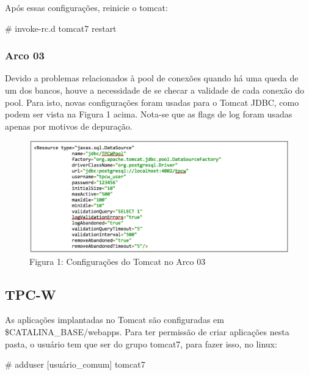 \documentclass[a4paper,10pt]{article}
\begin{document}
        Após essas configurações, reinicie o tomcat:

        \begin{spverbatim}
        # invoke-rc.d tomcat7 restart
        \end{spverbatim}

        \subsubsection{Arco 03} 
        
        Devido a problemas relacionados à pool de conexões quando há uma queda de um dos bancos, houve a necessidade de se checar a validade de cada conexão do pool. Para isto, novas configurações foram usadas para o Tomcat JDBC, como podem ser vista na Figura 1 acima. Nota-se que as flags de log foram usadas apenas por motivos de depuração.
       
        \begin{center}
        \begin{figure}
            \centering
          \includegraphics[width=14cm,keepaspectratio=true]{imagens/config_tomcat.png}
	        	        Figura 1: Configurações do Tomcat no Arco 03
        \end{figure}
	\end{center}
        
        \subsection{TPC-W}

        As aplicações implantadas no Tomcat são configuradas em \$CATALINA\_BASE/webapps. Para ter permissão de criar aplicações nesta pasta, o usuário tem que ser do grupo tomcat7, para fazer isso, no linux:

        \begin{spverbatim}
        # adduser [usuário_comum] tomcat7
        \end{spverbatim}
\end{document}
